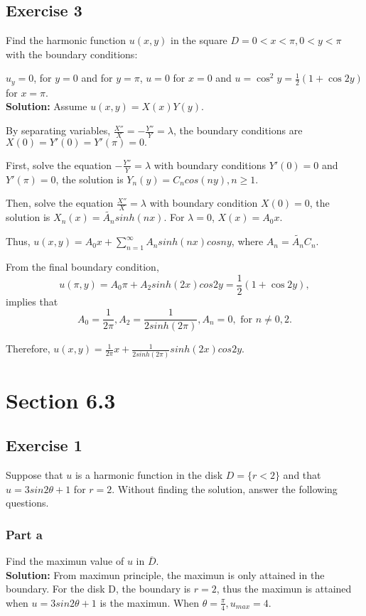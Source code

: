 \documentclass[12pt]{article}%
\begin{document}
     \subsection*{Exercise 3} Find the harmonic function $u(x,y)$ in the square $D={0<x<\pi, 0<y<\pi}$ with the boundary conditions:
   
     $ u_{y}=0$, for $y=0$ and for $y=\pi$, $ u=0$  for  $x=0 $  and  $u=\cos ^{2} y=\frac{1}{2}(1+\cos 2 y)$  for $ x=\pi $.\\
     \textbf{Solution:}
     Assume $u(x,y)=X(x)Y(y)$. 
     
     By separating variables, $\frac{X''}{X}=-\frac{Y''}{Y}=\lambda$, the boundary conditions are $X(0)=Y'(0)=Y'(\pi)=0.$
    
    First, solve the equation $-\frac{Y''}{Y}=\lambda$ with boundary conditions $Y'(0)=0$ and $Y'(\pi)=0$,
    the solution is $Y_{n}(y)=C_{n}cos (ny), n\ge 1$.

    Then, solve the equation $\frac{X''}{X}=\lambda$ with boundary condition $X(0)=0$, the solution is 
    $X_{n}(x)=\widetilde{A_{n}}sinh (nx)$.
    For $\lambda = 0$, $X(x)=A_{0}x$.
    
    Thus, $u(x,y)=A_{0}x+\sum_{n=1}^{\infty}A_{n}sinh(nx)cosny$, where $A_{n}=\widetilde{A_{n}}C_{n}$.

    From the final boundary condition, \[u(\pi,y)=A_{0}\pi+A_{2}sinh(2x)cos2y=\frac{1}{2}(1+\cos 2 y),\]
    implies that \[A_{0}=\frac{1}{2\pi}, A_{2}=\frac{1}{2sinh(2\pi)}, A_{n}=0, \text{ for } n \ne 0, 2.\]

    Therefore, $u(x,y)=\frac{1}{2\pi}x+\frac{1}{2sinh(2\pi)}sinh(2x)cos2y.$


    \section*{Section 6.3}
    \subsection*{Exercise 1} Suppose that $u$ is a harmonic function in the disk $D=\{r<2\}$ and that $u=3 sin2 \theta +1$ for $r=2$. Without finding the solution, answer the following questions.\\
    \subsubsection*{Part a} Find the maximun value of $u$ in $\overline{D} $.\\
    \textbf{Solution:}
    From maximun principle, the maximun is only attained in the boundary. 
    For the disk D, the boundary is $r=2$, thus the maximun is attained when $u=3 sin2 \theta +1$ is the maximun.
    When $\theta = \frac{\pi}{4}, u_{max}=4$.
    
\end{document}
